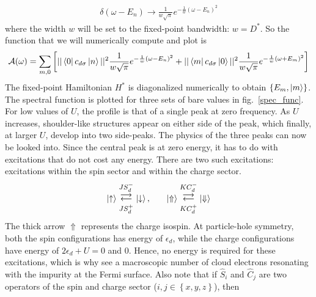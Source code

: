 \documentclass[12pt,twoside]{report}
\numberwithin{equation}{section}
\begin{document}
\begin{equation}\begin{aligned}
	\delta(\omega - E_n) \to \frac{1}{w\sqrt \pi}e^{-\frac{1}{w}\left( \omega - E_n \right)^2}
\end{aligned}\end{equation}
where the width \(w\) will be set to the fixed-point bandwidth: \(w = D^*\). So the function that we will numerically compute and plot is
\begin{equation}\begin{aligned}
	\mathcal{A(\omega)} &= \sum_{m,0}\left[||\bra{0}c_{d\sigma}\ket{n}||^2\frac{1}{w\sqrt \pi}e^{-\frac{1}{w}\left( \omega - E_n \right)^2} + ||\bra{m}c_{d\sigma}\ket{0}||^2\frac{1}{w\sqrt \pi}e^{-\frac{1}{w}\left( \omega + E_m \right)^2}\right]\\
\end{aligned}\end{equation}
The fixed-point Hamiltonian \(H^*\) is diagonalized numerically to obtain \(\left\{E_m, \ket{m}\right\}\). The spectral function is plotted for three sets of bare values in fig.~\ref{spec_func}. For low values of \(U\), the profile is that of a single peak at zero frequency. As \(U\) increases, shoulder-like structures appear on either side of the peak, which finally, at larger \(U\), develop into two side-peaks.
\pb The physics of the three peaks can now be looked into. Since the central peak is at zero energy, it has to do with excitations that do not cost any energy. There are two such excitations: excitations within the spin sector and within the charge sector.
\begin{equation}\begin{aligned}
	\ket{\uparrow} \mathrel{\mathlarger{\mathlarger{\mathop{\rightleftarrows}}^{J S_d^-}_{JS_d^+}}}\ket{\downarrow}, &&&&\ket{\Uparrow} \mathrel{\mathlarger{\mathlarger{\mathop{\rightleftarrows}}^{K C_d^-}_{K C_d^+}}}\ket{\Downarrow}\\
\end{aligned}\end{equation}
The thick arrow \(\Uparrow\) represents the charge isospin. At particle-hole symmetry, both the spin configurations has energy of \(\epsilon_d\), while the charge configurations have energy of \(2\epsilon_d + U=0\) and 0. Hence, no energy is required for these excitations, which is why see a macroscopic number of cloud electrons resonating with the impurity at the Fermi surface. Also note that if \(\hat S_i\) and \(\hat C_j\) are two operators of the spin and charge sector (\(i,j \in \left\{ x,y,z \right\} \)), then
\end{document}
